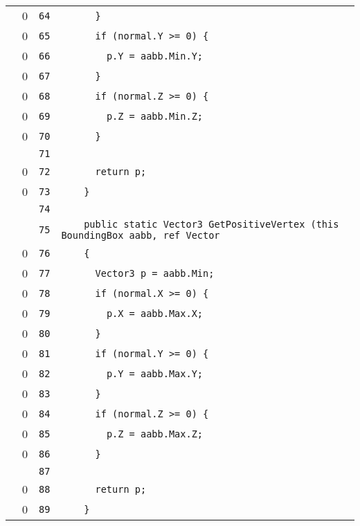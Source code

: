 \documentclass[a4paper,10pt]{article}
\begin{document}
\begin{longtable}[l]{lrrl}
\cellcolor{red} & 0 & \verb~64~ & \verb~      }~\\
\cellcolor{red} & 0 & \verb~65~ & \verb~      if (normal.Y >= 0) {~\\
\cellcolor{red} & 0 & \verb~66~ & \verb~        p.Y = aabb.Min.Y;~\\
\cellcolor{red} & 0 & \verb~67~ & \verb~      }~\\
\cellcolor{red} & 0 & \verb~68~ & \verb~      if (normal.Z >= 0) {~\\
\cellcolor{red} & 0 & \verb~69~ & \verb~        p.Z = aabb.Min.Z;~\\
\cellcolor{red} & 0 & \verb~70~ & \verb~      }~\\
\cellcolor{gray} &  & \verb~71~ & \verb~~\\
\cellcolor{red} & 0 & \verb~72~ & \verb~      return p;~\\
\cellcolor{red} & 0 & \verb~73~ & \verb~    }~\\
\cellcolor{gray} &  & \verb~74~ & \verb~~\\
\cellcolor{gray} &  & \verb~75~ & \verb~    public static Vector3 GetPositiveVertex (this BoundingBox aabb, ref Vector~\\
\cellcolor{red} & 0 & \verb~76~ & \verb~    {~\\
\cellcolor{red} & 0 & \verb~77~ & \verb~      Vector3 p = aabb.Min;~\\
\cellcolor{red} & 0 & \verb~78~ & \verb~      if (normal.X >= 0) {~\\
\cellcolor{red} & 0 & \verb~79~ & \verb~        p.X = aabb.Max.X;~\\
\cellcolor{red} & 0 & \verb~80~ & \verb~      }~\\
\cellcolor{red} & 0 & \verb~81~ & \verb~      if (normal.Y >= 0) {~\\
\cellcolor{red} & 0 & \verb~82~ & \verb~        p.Y = aabb.Max.Y;~\\
\cellcolor{red} & 0 & \verb~83~ & \verb~      }~\\
\cellcolor{red} & 0 & \verb~84~ & \verb~      if (normal.Z >= 0) {~\\
\cellcolor{red} & 0 & \verb~85~ & \verb~        p.Z = aabb.Max.Z;~\\
\cellcolor{red} & 0 & \verb~86~ & \verb~      }~\\
\cellcolor{gray} &  & \verb~87~ & \verb~~\\
\cellcolor{red} & 0 & \verb~88~ & \verb~      return p;~\\
\cellcolor{red} & 0 & \verb~89~ & \verb~    }~\\

\end{longtable}
\end{document}
